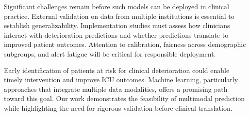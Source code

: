 Significant challenges remain before such models can be deployed in clinical practice. External validation on data from multiple institutions is essential to establish generalizability. Implementation studies must assess how clinicians interact with deterioration predictions and whether predictions translate to improved patient outcomes. Attention to calibration, fairness across demographic subgroups, and alert fatigue will be critical for responsible deployment.

Early identification of patients at risk for clinical deterioration could enable timely intervention and improve ICU outcomes. Machine learning, particularly approaches that integrate multiple data modalities, offers a promising path toward this goal. Our work demonstrates the feasibility of multimodal prediction while highlighting the need for rigorous validation before clinical translation.
